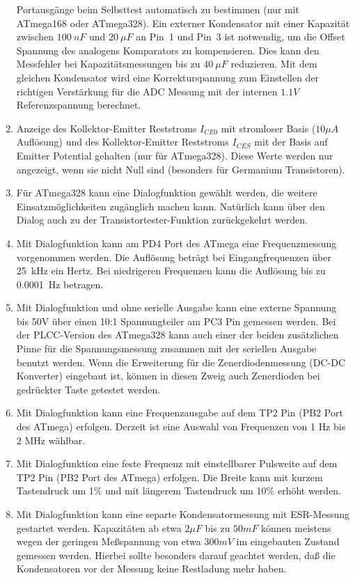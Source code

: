 \begin{enumerate}
Portausgänge beim Selbsttest automatisch zu bestimmen (nur mit ATmega168 oder ATmega328).
Ein externer Kondensator mit einer Kapazität zwischen \(100~nF\) und \(20~\mu F\) an Pin~1 und Pin~3 ist notwendig, 
um die Offset Spannung des analogens Komparators zu kompensieren.
Dies kann den Messfehler bei Kapazitätsmessungen bis zu \(40~\mu F\) reduzieren.
Mit dem gleichen Kondensator wird eine Korrekturspannung zum Einstellen der richtigen Verstärkung für
die ADC Messung mit der internen \(1.1V\) Referenzspannung berechnet.
\item Anzeige des Kollektor-Emitter Reststroms \(I_{CE0}\) mit stromloser Basis (\(10\mu A\) Auflösung) und
des Kollektor-Emitter Reststroms \(I_{CES}\) mit der Basis auf Emitter Potential gehalten (nur für ATmega328).
Diese Werte werden nur angezeigt, wenn sie nicht Null sind (besonders für Germanium Transistoren).
\item Für ATmega328 kann eine Dialogfunktion gewählt werden, die weitere Einsatzmöglichkeiten zugänglich machen kann.
Natürlich kann über den Dialog auch zu der Transistortester-Funktion zurückgekehrt werden.
\item Mit Dialogfunktion kann am PD4 Port des ATmega eine Frequenzmessung vorgenommen werden.
Die Auflösung beträgt bei Eingangfrequenzen über 25~kHz ein Hertz.
Bei niedrigeren Frequenzen kann die Auflösung bis zu 0.0001~Hz betragen.
\item Mit Dialogfunktion und ohne serielle Ausgabe kann eine externe Spannung bis 50V über einen
10:1 Spannungteiler am PC3 Pin gemessen werden. Bei der PLCC-Version des ATmega328 kann auch einer der beiden
zusätzlichen Pinne für die Spannungsmessung zusammen mit der seriellen Ausgabe benutzt werden.
Wenn die Erweiterung für die Zenerdiodenmessung (DC-DC Konverter)
eingebaut ist, können in diesen Zweig auch Zenerdioden bei gedrückter Taste getestet werden.
\item Mit Dialogfunktion kann eine Frequenzausgabe auf dem TP2 Pin (PB2 Port des ATmega) erfolgen.
Derzeit ist eine Auswahl von Frequenzen von 1 Hz bis 2 MHz wählbar.
\item Mit Dialogfunktion eine feste Frequenz mit einstellbarer Pulsweite auf dem TP2 Pin (PB2 Port des ATmega) erfolgen.
Die Breite kann mit kurzem Tastendruck um 1\% und mit längerem Tastendruck um 10\% erhöht werden.
\item Mit Dialogfunktion kann eine separte Kondensatormessung mit ESR-Messung gestartet werden.
 Kapazitäten ab etwa \(2 \mu F\) bis zu \(50 mF\) können meistens wegen der geringen Meßspannung von etwa \(300 mV\)
 im eingebauten Zustand gemessen werden.
 Hierbei sollte besonders darauf geachtet werden, daß die Kondensatoren vor der Messung keine Restladung mehr haben.

\end{enumerate}

